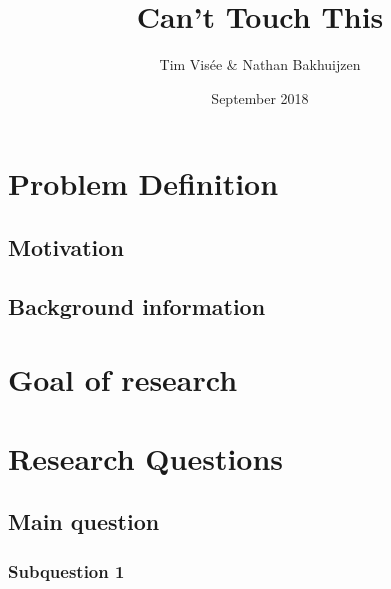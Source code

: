 \documentclass[a4paper]{article}
\title{Can't Touch This}
\author{Tim Visée \& Nathan Bakhuijzen}
\date{September 2018}
\begin{document}
  \maketitle

  \clearpage

  \section{Problem Definition}
  \subsection{Motivation}
  \subsection{Background information}
  \clearpage

  \section{Goal of research} %
  \clearpage

  \section{Research Questions}
  \subsection{Main question}
  \subsubsection{Subquestion 1}
\end{document}
